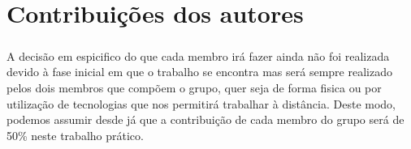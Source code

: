 \documentclass{report}
\begin{document}
\chapter*{Contribuições dos autores}
\label{chap.contribuição dos autores}
\paragraph{}

A decisão em espicifico do que cada membro irá fazer ainda não foi realizada devido à fase inicial em que o trabalho se encontra mas será sempre realizado pelos dois membros que compõem o grupo, quer seja de forma fisica ou por utilização de tecnologias que nos permitirá trabalhar à distância. Deste modo, podemos assumir desde já que a contribuição de cada membro do grupo será de 50\% neste trabalho prático.




\printbibliography
\end{document}
